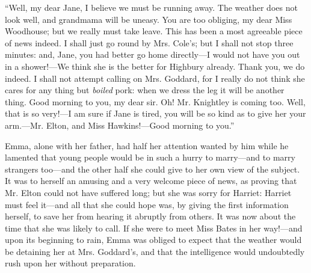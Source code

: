 




“Well, my dear Jane, I believe we must be running away. The weather does not look well, and grandmama will be uneasy. You are too obliging, my dear Miss Woodhouse; but we really must take leave. This has been a most agreeable piece of news indeed. I shall just go round by Mrs. Cole's; but I shall not stop three minutes: and, Jane, you had better go home directly---I would not have you out in a shower!---We think she is the better for Highbury already. Thank you, we do indeed. I shall not attempt calling on Mrs. Goddard, for I really do not think she cares for any thing but {\em boiled} pork: when we dress the leg it will be another thing. Good morning to you, my dear sir. Oh! Mr. Knightley is coming too. Well, that is so very!---I am sure if Jane is tired, you will be so kind as to give her your arm.---Mr. Elton, and Miss Hawkins!---Good morning to you.”

Emma, alone with her father, had half her attention wanted by him while he lamented that young people would be in such a hurry to marry---and to marry strangers too---and the other half she could give to her own view of the subject. It was to herself an amusing and a very welcome piece of news, as proving that Mr. Elton could not have suffered long; but she was sorry for Harriet: Harriet must feel it---and all that she could hope was, by giving the first information herself, to save her from hearing it abruptly from others. It was now about the time that she was likely to call. If she were to meet Miss Bates in her way!---and upon its beginning to rain, Emma was obliged to expect that the weather would be detaining her at Mrs. Goddard's, and that the intelligence would undoubtedly rush upon her without preparation.


